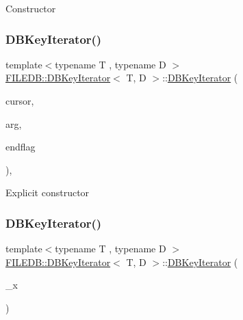 Constructor \mbox{\label{classFILEDB_1_1DBKeyIterator_a7dc82bdde4a77bcadd704a3e87f6534a}} 
\subsubsection{\texorpdfstring{DBKeyIterator()}{DBKeyIterator()}\hspace{0.1cm}{\footnotesize\ttfamily [2/6]}}
{\footnotesize\ttfamily template$<$typename T , typename D $>$ \\
\mbox{\hyperlink{classFILEDB_1_1DBKeyIterator}{F\+I\+L\+E\+D\+B\+::\+D\+B\+Key\+Iterator}}$<$ T, D $>$\+::\mbox{\hyperlink{classFILEDB_1_1DBKeyIterator}{D\+B\+Key\+Iterator}} (\begin{DoxyParamCaption}\item[{const \mbox{\hyperlink{classFILEDB_1_1DBCursor}{D\+B\+Cursor}} \&}]{cursor,  }\item[{const T \&}]{arg,  }\item[{int}]{endflag }\end{DoxyParamCaption})\hspace{0.3cm}{\ttfamily [inline]}, {\ttfamily [explicit]}}

Explicit constructor \mbox{\label{classFILEDB_1_1DBKeyIterator_ac1fa531110379c3deb566758095e8a0e}} 
\subsubsection{\texorpdfstring{DBKeyIterator()}{DBKeyIterator()}\hspace{0.1cm}{\footnotesize\ttfamily [3/6]}}
{\footnotesize\ttfamily template$<$typename T , typename D $>$ \\
\mbox{\hyperlink{classFILEDB_1_1DBKeyIterator}{F\+I\+L\+E\+D\+B\+::\+D\+B\+Key\+Iterator}}$<$ T, D $>$\+::\mbox{\hyperlink{classFILEDB_1_1DBKeyIterator}{D\+B\+Key\+Iterator}} (\begin{DoxyParamCaption}\item[{const \mbox{\hyperlink{classFILEDB_1_1DBKeyIterator}{D\+B\+Key\+Iterator}}$<$ T, D $>$ \&}]{\+\_\+x }\end{DoxyParamCaption})\hspace{0.3cm}{\ttfamily [inline]}}

